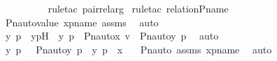 \begin{isabellebody}
\ \ \ \ \ \ \ \ \isamarkupfalse%
\ {\isacharparenleft}{\kern0pt}rule{\isacharunderscore}{\kern0pt}tac\ pair{\isacharunderscore}{\kern0pt}rel{\isacharunderscore}{\kern0pt}arg{\isacharparenright}{\kern0pt}\ \isamarkupfalse%
{\isacharparenleft}{\kern0pt}rule{\isacharunderscore}{\kern0pt}tac\ relation{\isacharunderscore}{\kern0pt}P{\isacharunderscore}{\kern0pt}name{\isacharparenright}{\kern0pt}\ \isanewline
\ \ \ \ \ \ \ \ \isamarkupfalse%
\ Pn{\isacharunderscore}{\kern0pt}auto{\isacharunderscore}{\kern0pt}value\ xpname\ assms\ \isamarkupfalse%
\ auto\ \isanewline
\ \ \ \ \ \ \isamarkupfalse%
\ \isamarkupfalse%
\ y{\isacharprime}{\kern0pt}\ p{\isacharprime}{\kern0pt}\ \ y{\isacharprime}{\kern0pt}p{\isacharprime}{\kern0pt}H\ {\isacharcolon}{\kern0pt}\ {\isachardoublequoteopen}{\isacharless}{\kern0pt}y{\isacharprime}{\kern0pt}{\isacharcomma}{\kern0pt}\ p{\isacharprime}{\kern0pt}{\isachargreater}{\kern0pt}\ {\isasymin}\ Pn{\isacharunderscore}{\kern0pt}auto{\isacharparenleft}{\kern0pt}{\isasymtau}{\isacharparenright}{\kern0pt}{\isacharbackquote}{\kern0pt}x{\isachardoublequoteclose}\ {\isachardoublequoteopen}v\ {\isacharequal}{\kern0pt}\ {\isacharless}{\kern0pt}Pn{\isacharunderscore}{\kern0pt}auto{\isacharparenleft}{\kern0pt}{\isasympi}{\isacharparenright}{\kern0pt}{\isacharbackquote}{\kern0pt}y{\isacharprime}{\kern0pt}{\isacharcomma}{\kern0pt}\ {\isasympi}{\isacharbackquote}{\kern0pt}p{\isacharprime}{\kern0pt}{\isachargreater}{\kern0pt}{\isachardoublequoteclose}\ \isamarkupfalse%
\ auto\ \isanewline
\ \ \ \ \ \ \isamarkupfalse%
\ \isamarkupfalse%
\ {\isachardoublequoteopen}{\isacharless}{\kern0pt}y{\isacharprime}{\kern0pt}{\isacharcomma}{\kern0pt}\ p{\isacharprime}{\kern0pt}{\isachargreater}{\kern0pt}\ {\isasymin}\ {\isacharbraceleft}{\kern0pt}\ {\isacharless}{\kern0pt}Pn{\isacharunderscore}{\kern0pt}auto{\isacharparenleft}{\kern0pt}{\isasymtau}{\isacharparenright}{\kern0pt}{\isacharbackquote}{\kern0pt}y{\isacharcomma}{\kern0pt}\ {\isasymtau}{\isacharbackquote}{\kern0pt}p{\isachargreater}{\kern0pt}\ {\isachardot}{\kern0pt}\ {\isacharless}{\kern0pt}y{\isacharcomma}{\kern0pt}\ p{\isachargreater}{\kern0pt}\ {\isasymin}\ x\ {\isacharbraceright}{\kern0pt}{\isachardoublequoteclose}\ \isamarkupfalse%
\ Pn{\isacharunderscore}{\kern0pt}auto\ assms\ xpname\ \isamarkupfalse%
\ auto\isanewline
\ \ \ \ \ \ \isamarkupfalse%
\ \isamarkupfalse%

\end{isabellebody}
